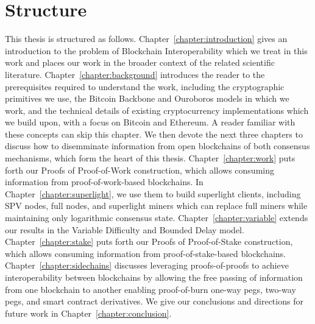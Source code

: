 \ifuniversity\else
\section*{Structure}
\fi

This thesis is structured as follows. Chapter~\ref{chapter:introduction} gives
an introduction to the problem of Blockchain Interoperability which we treat in
this work and places our work in the broader context of the related scientific
literature. Chapter~\ref{chapter:background} introduces the reader to the
prerequisites required to understand the work, including the cryptographic
primitives we use, the Bitcoin Backbone and Ouroboros models in which we work, and the
technical details of existing cryptocurrency implementations which we build
upon, with a focus on Bitcoin and Ethereum. A reader familiar with
these concepts can skip this chapter. We then devote the next three chapters to
discuss how to disemminate information from open blockchains of both consensus
mechanisms, which form the heart of this thesis. Chapter~\ref{chapter:work} puts forth our Proofs of Proof-of-Work
construction, which allows consuming information from proof-of-work-based
blockchains. In Chapter~\ref{chapter:superlight}, we use them to build
superlight clients, including SPV nodes, full nodes, and superlight miners which
can replace full miners while maintaining only logarithmic consensus state.  Chapter~\ref{chapter:variable} extends our results in the Variable Difficulty and Bounded Delay model. Chapter~\ref{chapter:stake} puts forth our Proofs of
Proof-of-Stake construction, which allows consuming information from
proof-of-stake-based blockchains. Chapter~\ref{chapter:sidechains} discusses
leveraging proofs-of-proofs to achieve interoperability between blockchains by
allowing the free passing of information from one blockchain to another enabling
proof-of-burn one-way pegs, two-way pegs, and smart
contract derivatives. We give our conclusions and directions for future work in
Chapter~\ref{chapter:conclusion}.
